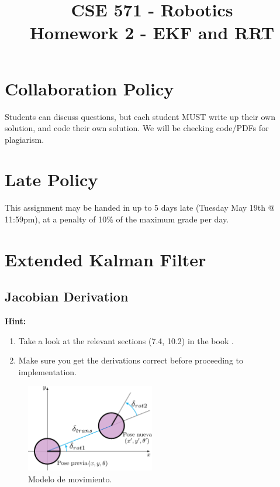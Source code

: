 \documentclass[tp]{lcc}
\title{CSE 571 - Robotics \\ Homework 2 - EKF and RRT}
\author{}
\date{}
\begin{document}
\maketitle

\section*{Collaboration Policy}
Students can discuss questions, but each student MUST write up their own solution, and code their own solution. We will be checking code/PDFs for plagiarism.

\section*{Late Policy}
This assignment may be handed in up to 5 days late (Tuesday May 19th @ 11:59pm), at a penalty of 10\% of the maximum grade per day.

\section{Extended Kalman Filter}

\subsection{Jacobian Derivation}

\textbf{Hint:}
\begin{enumerate}
    \item Take a look at the relevant sections (7.4, 10.2) in the book \cite{thrun2005probabilistic}.
    \item Make sure you get the derivations correct before proceeding to implementation.
\end{enumerate}

\begin{figure}[!htbp]
    \centering
    \includegraphics[width=0.5\textwidth]{./images/odometry_as_controls.pdf}
    \caption{Modelo de movimiento.}
    \label{fig:odometry-base-motion-model}
\end{figure}
\end{document}
